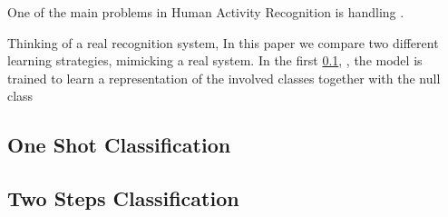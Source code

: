 One of the main problems in Human Activity Recognition is handling .

Thinking of a real recognition system, 
In this paper we compare two different learning strategies, mimicking a real system. In the first \ref{sub:oneshot}, , the model is trained to learn a representation of the involved classes together with the null class

\subsection{One Shot Classification}
\label{sub:oneshot}

\subsection{Two Steps Classification}
\label{sub:twosteps}
